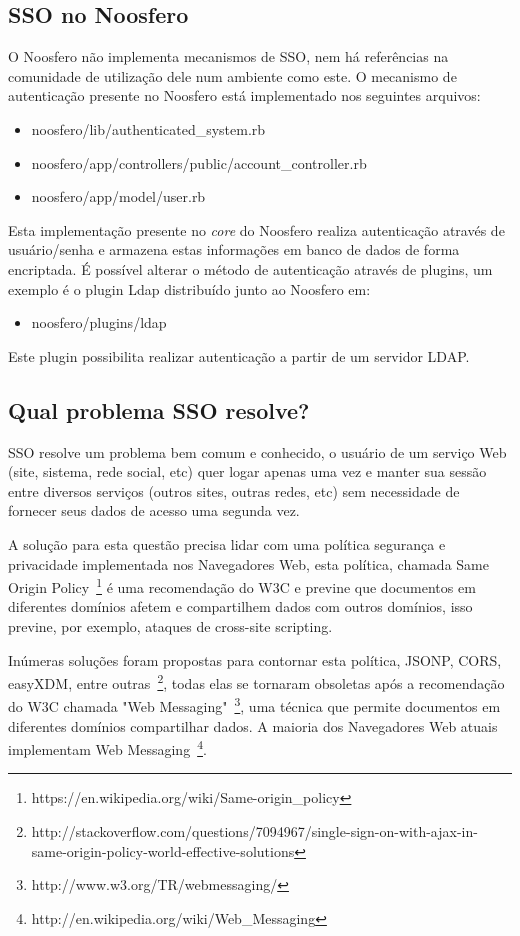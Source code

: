 \documentclass[11pt]{article}
\begin{document}
\subsection{SSO no Noosfero}

O Noosfero não implementa mecanismos de SSO, nem há referências na comunidade
de utilização dele num ambiente como este. O mecanismo de autenticação presente
no Noosfero está implementado nos seguintes arquivos:

\begin{itemize}
  \item noosfero/lib/authenticated\_system.rb
  \item noosfero/app/controllers/public/account\_controller.rb
  \item noosfero/app/model/user.rb
\end{itemize}

Esta implementação presente no {\it core} do Noosfero realiza autenticação
através de usuário/senha e armazena estas informações em banco de dados de
forma encriptada. É possível alterar o método de autenticação através de
plugins, um exemplo é o plugin Ldap distribuído junto ao Noosfero em:

\begin{itemize}
  \item noosfero/plugins/ldap
\end{itemize}

Este plugin possibilita realizar autenticação a partir de um servidor LDAP.

\subsection{Qual problema SSO resolve?}

SSO resolve um problema bem comum e conhecido, o usuário de um serviço Web
(site, sistema, rede social, etc) quer logar apenas uma vez e manter sua
sessão entre diversos serviços (outros sites, outras redes, etc) sem
necessidade de fornecer seus dados de acesso uma segunda vez.

A solução para esta questão precisa lidar com uma política segurança e
privacidade implementada nos Navegadores Web, esta política, chamada Same
Origin Policy~\footnote{https://en.wikipedia.org/wiki/Same-origin\_policy} é
uma recomendação do W3C e previne que documentos em diferentes domínios afetem
e compartilhem dados com outros domínios, isso previne, por exemplo, ataques de
cross-site scripting.

Inúmeras soluções foram propostas para contornar esta política, JSONP, CORS,
easyXDM, entre
outras~\footnote{http://stackoverflow.com/questions/7094967/single-sign-on-with-ajax-in-same-origin-policy-world-effective-solutions}, todas elas se tornaram obsoletas após a recomendação do
W3C chamada "Web Messaging"~\footnote{http://www.w3.org/TR/webmessaging/}, uma
técnica que permite documentos em diferentes domínios compartilhar dados. A
maioria dos Navegadores Web atuais implementam Web
Messaging~\footnote{http://en.wikipedia.org/wiki/Web\_Messaging}.
\end{document}
